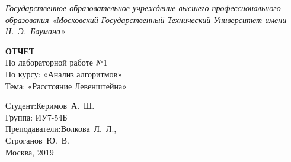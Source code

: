 \begin{titlepage}
	\centering

	{\footnotesize \itshape Государственное образовательное учреждение высшего профессионального образования «Московский Государственный Технический Университет имени Н.~Э.~Баумана»\\}

	\vspace{60mm}

	\textbf{ОТЧЕТ}\\
	По лабораторной работе №1\\
	По курсу: «Анализ алгоритмов»\\
	Тема: «Расстояние Левенштейна»\\

	\vspace{60mm}

	\hspace{70mm} Студент:\hfill Керимов~А.~Ш.\\
	\hspace{70mm} Группа: \hfill ИУ7-54Б\\
	\hspace{70mm} Преподаватели:\hfill Волкова~Л.~Л.,\\
	                            \hfill Строганов~Ю.~В.\\

	\vfill
	Москва, 2019
\end{titlepage}
